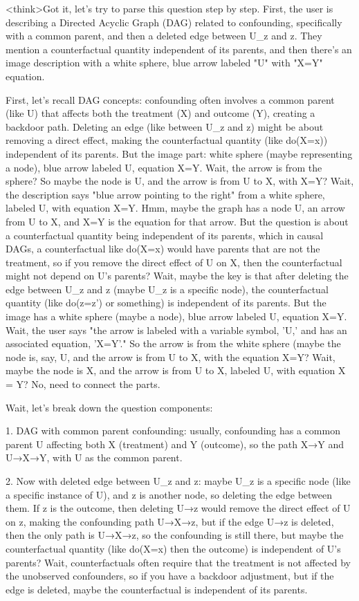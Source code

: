 <think>Got it, let's try to parse this question step by step. First, the user is describing a Directed Acyclic Graph (DAG) related to confounding, specifically with a common parent, and then a deleted edge between U_z and z. They mention a counterfactual quantity independent of its parents, and then there's an image description with a white sphere, blue arrow labeled "U" with "X=Y" equation.

First, let's recall DAG concepts: confounding often involves a common parent (like U) that affects both the treatment (X) and outcome (Y), creating a backdoor path. Deleting an edge (like between U_z and z) might be about removing a direct effect, making the counterfactual quantity (like do(X=x)) independent of its parents. But the image part: white sphere (maybe representing a node), blue arrow labeled U, equation X=Y. Wait, the arrow is from the sphere? So maybe the node is U, and the arrow is from U to X, with X=Y? Wait, the description says "blue arrow pointing to the right" from a white sphere, labeled U, with equation X=Y. Hmm, maybe the graph has a node U, an arrow from U to X, and X=Y is the equation for that arrow. But the question is about a counterfactual quantity being independent of its parents, which in causal DAGs, a counterfactual like do(X=x) would have parents that are not the treatment, so if you remove the direct effect of U on X, then the counterfactual might not depend on U's parents? Wait, maybe the key is that after deleting the edge between U_z and z (maybe U_z is a specific node), the counterfactual quantity (like do(z=z') or something) is independent of its parents. But the image has a white sphere (maybe a node), blue arrow labeled U, equation X=Y. Wait, the user says "the arrow is labeled with a variable symbol, 'U,' and has an associated equation, 'X=Y'." So the arrow is from the white sphere (maybe the node is, say, U, and the arrow is from U to X, with the equation X=Y? Wait, maybe the node is X, and the arrow is from U to X, labeled U, with equation X = Y? No, need to connect the parts.

Wait, let's break down the question components:

1. DAG with common parent confounding: usually, confounding has a common parent U affecting both X (treatment) and Y (outcome), so the path X→Y and U→X→Y, with U as the common parent.

2. Now with deleted edge between U_z and z: maybe U_z is a specific node (like a specific instance of U), and z is another node, so deleting the edge between them. If z is the outcome, then deleting U→z would remove the direct effect of U on z, making the confounding path U→X→z, but if the edge U→z is deleted, then the only path is U→X→z, so the confounding is still there, but maybe the counterfactual quantity (like do(X=x) then the outcome) is independent of U's parents? Wait, counterfactuals often require that the treatment is not affected by the unobserved confounders, so if you have a backdoor adjustment, but if the edge is deleted, maybe the counterfactual is independent of its parents.

